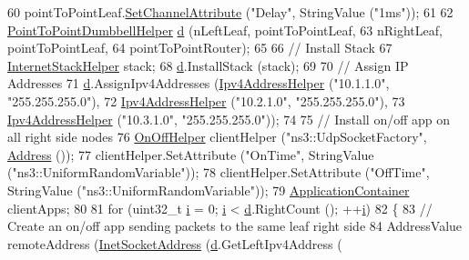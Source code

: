 \begin{DoxyCode}
60   pointToPointLeaf.\hyperlink{classns3_1_1PointToPointHelper_a6b5317fd17fb61e5a53f8d66a90b63b9}{SetChannelAttribute}   (\textcolor{stringliteral}{"Delay"}, StringValue (\textcolor{stringliteral}{"1ms"}));
61 
62   \hyperlink{classns3_1_1PointToPointDumbbellHelper}{PointToPointDumbbellHelper} \hyperlink{buildings__pathloss_8m_a9f9b934daed17a4d3613b6886ff4cf4b}{d} (nLeftLeaf, pointToPointLeaf,
63                                 nRightLeaf, pointToPointLeaf,
64                                 pointToPointRouter);
65 
66   \textcolor{comment}{// Install Stack}
67   \hyperlink{classns3_1_1InternetStackHelper}{InternetStackHelper} stack;
68   \hyperlink{buildings__pathloss_8m_a9f9b934daed17a4d3613b6886ff4cf4b}{d}.InstallStack (stack);
69 
70   \textcolor{comment}{// Assign IP Addresses}
71   \hyperlink{buildings__pathloss_8m_a9f9b934daed17a4d3613b6886ff4cf4b}{d}.AssignIpv4Addresses (\hyperlink{classns3_1_1Ipv4AddressHelper}{Ipv4AddressHelper} (\textcolor{stringliteral}{"10.1.1.0"}, \textcolor{stringliteral}{"255.255.255.0"}),
72                          \hyperlink{classns3_1_1Ipv4AddressHelper}{Ipv4AddressHelper} (\textcolor{stringliteral}{"10.2.1.0"}, \textcolor{stringliteral}{"255.255.255.0"}),
73                          \hyperlink{classns3_1_1Ipv4AddressHelper}{Ipv4AddressHelper} (\textcolor{stringliteral}{"10.3.1.0"}, \textcolor{stringliteral}{"255.255.255.0"}));
74 
75   \textcolor{comment}{// Install on/off app on all right side nodes}
76   \hyperlink{classns3_1_1OnOffHelper}{OnOffHelper} clientHelper (\textcolor{stringliteral}{"ns3::UdpSocketFactory"}, \hyperlink{classns3_1_1Address}{Address} ());
77   clientHelper.SetAttribute (\textcolor{stringliteral}{"OnTime"}, StringValue (\textcolor{stringliteral}{"ns3::UniformRandomVariable"}));
78   clientHelper.SetAttribute (\textcolor{stringliteral}{"OffTime"}, StringValue (\textcolor{stringliteral}{"ns3::UniformRandomVariable"}));
79   \hyperlink{classns3_1_1ApplicationContainer}{ApplicationContainer} clientApps;
80 
81   \textcolor{keywordflow}{for} (uint32\_t \hyperlink{bernuolliDistribution_8m_a6f6ccfcf58b31cb6412107d9d5281426}{i} = 0; \hyperlink{bernuolliDistribution_8m_a6f6ccfcf58b31cb6412107d9d5281426}{i} < \hyperlink{buildings__pathloss_8m_a9f9b934daed17a4d3613b6886ff4cf4b}{d}.RightCount (); ++\hyperlink{bernuolliDistribution_8m_a6f6ccfcf58b31cb6412107d9d5281426}{i})
82     \{
83       \textcolor{comment}{// Create an on/off app sending packets to the same leaf right side}
84       AddressValue remoteAddress (\hyperlink{classns3_1_1InetSocketAddress}{InetSocketAddress} (\hyperlink{buildings__pathloss_8m_a9f9b934daed17a4d3613b6886ff4cf4b}{d}.GetLeftIpv4Address (

\end{DoxyCode}
